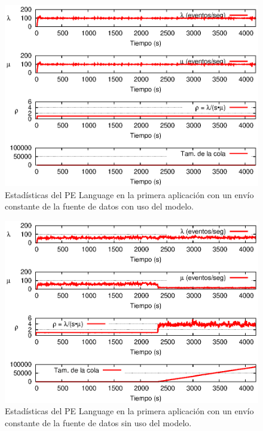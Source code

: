 \begin{figure}[!ht]
\centering
    \includegraphics[scale=1.1]{images/exp/app1/uniform/cm/statusLanguagePE.eps}
    \caption{Estad\'isticas del PE Language en la primera aplicaci\'on con un env\'io constante de la fuente de datos con uso del modelo.}
    \label{fig:app1-uniform-statusLanguagePE-cm}
\end{figure}

\begin{figure}[!ht]
\centering
    \includegraphics[scale=1.1]{images/exp/app1/uniform/sm/statusLanguagePE.eps}
    \caption{Estad\'isticas del PE Language en la primera aplicaci\'on con un env\'io constante de la fuente de datos sin uso del modelo.}
    \label{fig:app1-uniform-statusLanguagePE-sm}
\end{figure}

